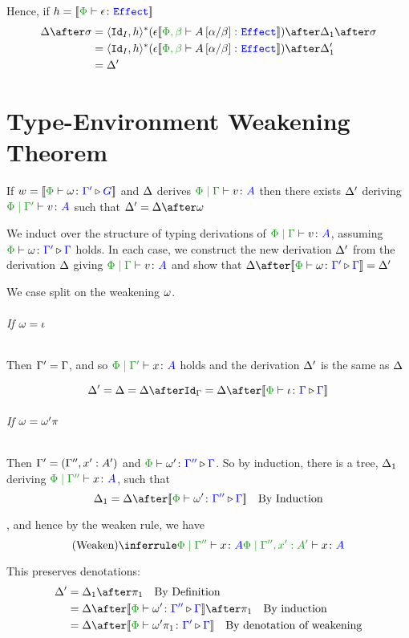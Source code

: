 \documentclass{report}
\begin{document}
Hence, if $h = \deno{\typerelation{\P}{\e}{\effect}}$
\begin{align*}
    \D\after\si &= \pr{\Id{I}}{h}\star(\e{\deno{\typerelation{\P,\b}{A\ssub{\b}{\a}}{\effect}}})\after\D_1\after\si\\
    &= \pr{\Id{I}}{h}\star(\e{\deno{\typerelation{\P,\b}{A\ssub{\b}{\a}}{\effect}}})\after\D_1'\\
    & = \D'
\end{align*}


\chapter{Type-Environment Weakening Theorem}

If $w = \deno{\ewrel{\P}{\w}{\G'}{G}}$ and $\Delta$ derives  $\gpetyperelation{v}{A}$ then there exists $\Delta'$ deriving $\etyperelation{\P}{\G'}{v}{A}$ such that $\D' = \D\after\w$

\proof
We induct over the structure of typing derivations of $\gpetyperelation{v}{A}$, assuming $\ewrel{\P}{\w}{\G'}{\G}$ holds. In each case, we construct the new derivation $\Delta'$ from the derivation $\Delta$ giving $\gpetyperelation{v}{A}$ and show that $\D\after\deno{\ewrel{\P}{\w}{\G'}{\G}} = \D'$

        We case split on the weakening $\omega$.
        \subparagraph{If $\omega = \iota$}
        Then $\Gamma' = \Gamma$, and so $\etyperelation{\P}{\G'}{x}{A}$ holds and the derivation $\Delta'$ is the same as $\Delta$

        \begin{equation}
            \D' = \D = \D\after\idg = \D\after\deno{\ewrel{\P}{\i}{\G}{\G}} 
        \end{equation}
        \subparagraph{If $\omega = \omega'\pi$}
        Then  $\Gamma' = (\Gamma'',x': A')$ and $\ewrel{\P}{\w'}{\G''}{\G}$. So by induction, there is a tree, $\Delta_1$ deriving $\etyperelation{\P}{\G''}{x}{A}$,  such that 
        \begin{equation}
            \D_1 = \D\after\deno{\ewrel{\P}{\w'}{\G''}{\G}} \qt{By Induction}
        \end{equation}
        
        , and hence by the weaken rule, we have 
        \begin{equation}
            \ntreeruleI{Weaken}{\etyperelation{\P}{\G''}{x}{A}}{\etyperelation{\P}{\G'', x':A' }{x}{A}}
        \end{equation}

        This preserves denotations:
        \begin{align*}
            \D' & = \D_1\after\p\qt{By Definition} \\
            & = \D\after\deno{\ewrel{\P}{\w'}{\G''}{\G}}\after\p\qt{By induction}\\
            & = \D\after\deno{\ewrel{\P}{\w'\p}{\G'}{\G}}\qt{By denotation of weakening}
        \end{align*}
\end{document}
